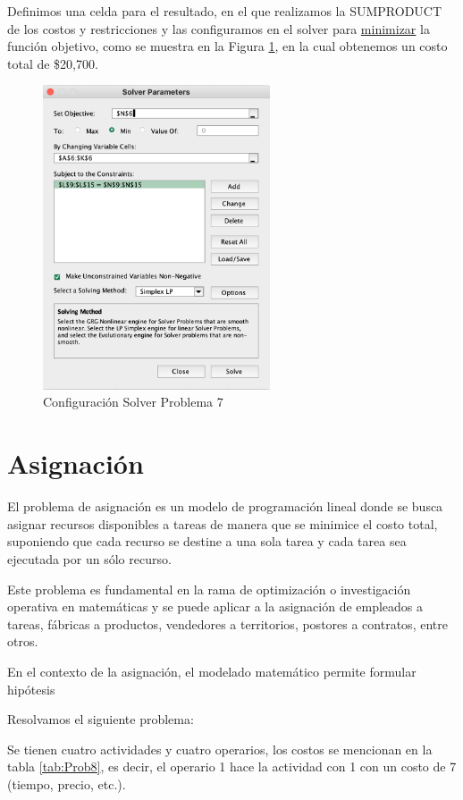 \documentclass[12pt]{article}  %
\begin{document}
Definimos una celda para el resultado, en el que realizamos la SUMPRODUCT de los costos y restricciones y las configuramos en el solver para \underline{minimizar} la función objetivo, como se muestra en la Figura \ref{fig:configSolverProb7}, en la cual obtenemos un costo total de \$20,700.

\begin{figure}[H]
\centering
\caption{Configuración Solver Problema 7}
\label{fig:configSolverProb7}
\includegraphics[width=0.6\textwidth]{assets/configSolverProb7.png}
\end{figure}

\section{Asignación}
El problema de asignación es un modelo de programación lineal donde se busca asignar recursos disponibles a tareas de manera que se minimice el costo total, suponiendo que cada recurso se destine a una sola tarea y cada tarea sea ejecutada por un sólo recurso.

Este problema es fundamental en la rama de optimización o investigación operativa en matemáticas y se puede aplicar a la asignación de empleados a tareas, fábricas a productos, vendedores a territorios, postores a contratos, entre otros.

En el contexto de la asignación, el modelado matemático permite formular hipótesis 

Resolvamos el siguiente problema:

Se tienen cuatro actividades y cuatro operarios, los costos se mencionan en la tabla \ref{tab:Prob8}, es decir, el operario 1 hace la actividad con 1 con un costo de 7 (tiempo, precio, etc.).
\end{document}
